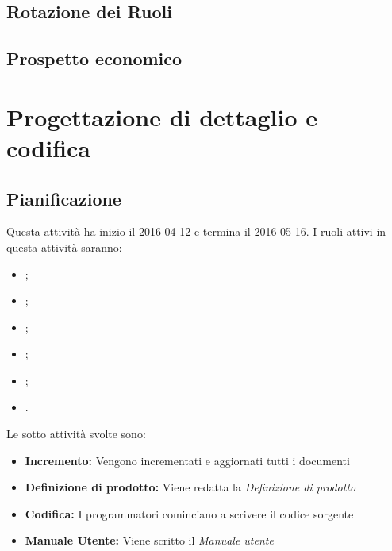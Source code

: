 \documentclass[12pt,a4paper]{article}
\begin{document}
\subsection{Rotazione dei Ruoli}

\subsection{Prospetto economico}

\newpage
\section{Progettazione di dettaglio e codifica} %

\subsection{Pianificazione}

Questa attività ha inizio il 2016-04-12 e termina il 2016-05-16. I ruoli attivi in questa attività saranno:
\begin{itemize}
	\item \PM;
	\item \AM;
	\item \AN;
    \item \PR;
    \item \PG;
    \item \VR.
\end{itemize}
Le sotto attività svolte sono:
\begin{itemize}
	\item \textbf{Incremento:} Vengono incrementati e aggiornati tutti i documenti
    \item \textbf{Definizione di prodotto:} Viene redatta la \textit{Definizione di prodotto}
    \item \textbf{Codifica:} I programmatori cominciano a scrivere il codice sorgente
    \item \textbf{Manuale Utente:} Viene scritto il \textit{Manuale utente}
\end{itemize}
\end{document}
